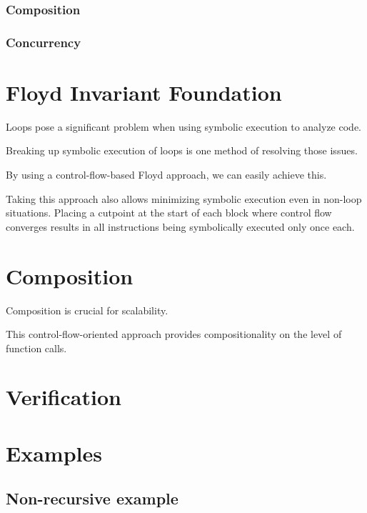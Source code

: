 \subsubsection{Composition}
\subsubsection{Concurrency}

\section{Floyd Invariant Foundation}\label{se:cfg_invariant}

Loops pose a significant problem when using symbolic execution to analyze code.

Breaking up symbolic execution of loops is one method of resolving those issues.

By using a control-flow-based Floyd approach, we can easily achieve this.

Taking this approach also allows minimizing symbolic execution
even in non-loop situations.
Placing a cutpoint at the start of each block where control flow converges
results in all instructions being symbolically executed only once each.


\section{Composition}
Composition is crucial for scalability.

This control-flow-oriented approach provides compositionality
on the level of function calls.


\section{Verification}\label{se:cfg_verification}

\section{Examples}\label{se:cfg_examples}
\subsection{Non-recursive example}

